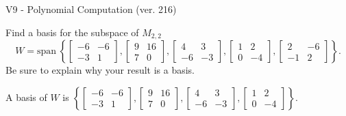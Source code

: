\begin{exercise}
  \begin{exerciseTitle}V9 - Polynomial Computation (ver. 216)\end{exerciseTitle}
  \begin{exerciseStatement}
    Find a basis for the subspace of \(M_{2,2}\) 
\[W=\mathrm{span}\ \left\{\left[\begin{array}{cc}
-6 & -6 \\
-3 & 1
\end{array}\right] , \left[\begin{array}{cc}
9 & 16 \\
7 & 0
\end{array}\right] , \left[\begin{array}{cc}
4 & 3 \\
-6 & -3
\end{array}\right] , \left[\begin{array}{cc}
1 & 2 \\
0 & -4
\end{array}\right] , \left[\begin{array}{cc}
2 & -6 \\
-1 & 2
\end{array}\right]\right\}.\]
 Be sure to explain why your result is a basis.


  \end{exerciseStatement}
  \begin{exerciseAnswer}
   A basis of \(W\) is  \(\left\{\left[\begin{array}{cc}
-6 & -6 \\
-3 & 1
\end{array}\right] , \left[\begin{array}{cc}
9 & 16 \\
7 & 0
\end{array}\right] , \left[\begin{array}{cc}
4 & 3 \\
-6 & -3
\end{array}\right] , \left[\begin{array}{cc}
1 & 2 \\
0 & -4
\end{array}\right]\right\}\).
  


  \end{exerciseAnswer}
\end{exercise}